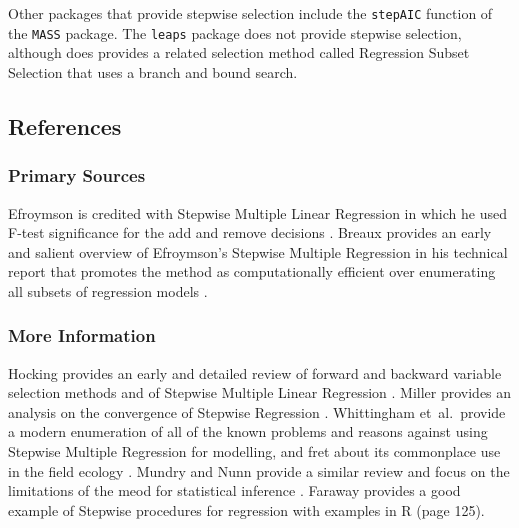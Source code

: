 Other packages that provide stepwise selection include the \texttt{stepAIC} function of the \texttt{MASS} package. The \texttt{leaps} package does not provide stepwise selection, although does provides a related selection method called Regression Subset Selection that uses a branch and bound search.

\subsection{References}

\subsubsection{Primary Sources}
Efroymson is credited with Stepwise Multiple Linear Regression in which he used F-test significance for the add and remove decisions \cite{Efroymson1960}.
Breaux provides an early and salient overview of Efroymson's Stepwise Multiple Regression in his technical report that promotes the method as computationally efficient over enumerating all subsets of regression models \cite{Breaux1967}.

\subsubsection{More Information}
Hocking provides an early and detailed review of forward and backward variable selection methods and of Stepwise Multiple Linear Regression \cite{Hocking1976}.
Miller provides an analysis on the convergence of Stepwise Regression \cite{Miller1996}.
Whittingham et~al.\ provide a modern enumeration of all of the known problems and reasons against using Stepwise Multiple Regression for modelling, and fret about its commonplace use in the field ecology \cite{Whittingham2006}.
Mundry and Nunn provide a similar review and focus on the limitations of the meod for statistical inference \cite{Mundry2009}.
Faraway provides a good example of Stepwise procedures for regression with examples in R \cite{Faraway2002} (page 125).


